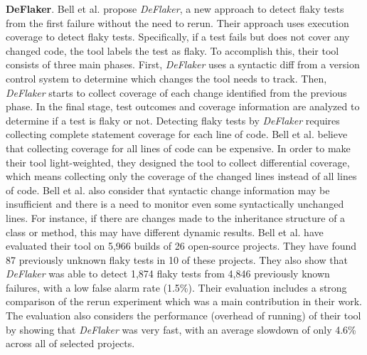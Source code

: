 \textbf{DeFlaker}. Bell et al. \cite{bell2018deflaker} propose \emph{DeFlaker}, a new approach to detect flaky tests from the first failure without the need to rerun. Their approach uses execution coverage to detect flaky tests. Specifically, if a test fails but does not cover any changed code, the tool labels the test as flaky.
To accomplish this, their tool consists of three main phases. First, \emph{DeFlaker} uses a syntactic diff from a version control system to determine which changes the tool needs to track. Then, \emph{DeFlaker} starts to collect coverage of each change identified from the previous phase. In the final stage, test outcomes and coverage information are analyzed to determine if a test is flaky or not. Detecting flaky tests by \emph{DeFlaker} requires collecting complete statement coverage for each line of code. Bell et al. \cite{bell2018deflaker} believe that collecting coverage for all lines of code can be expensive. In order to make their tool light-weighted, they designed the tool to collect differential coverage, which means collecting only the coverage of the changed lines instead of all lines of code. Bell et al. \cite{bell2018deflaker} also consider that syntactic change information may be insufficient and there is a need to monitor even some syntactically unchanged lines. For instance, if there are changes made to the inheritance structure of a class or method, this may have different dynamic results. Bell et al. \cite{bell2018deflaker} have evaluated their tool on 5,966 builds of 26 open-source projects. They have found 87 previously unknown flaky tests in 10 of these projects. They also show that \emph{DeFlaker} was able to detect 1,874 flaky tests from 4,846 previously known failures, with a low false alarm rate (1.5\%). Their evaluation includes a strong comparison of the rerun experiment which was a main contribution in their work. The evaluation also considers the performance (overhead of running) of their tool by showing that \emph{DeFlaker} was very fast, with an average slowdown of only 4.6\% across all of selected projects. 



